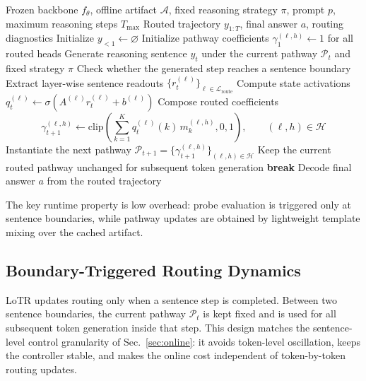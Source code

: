 \begin{algorithm}[t]
\caption{LoTR Online Sentence-Level Routing}
\label{alg:lotr_online}
\begin{algorithmic}[1]
\REQUIRE Frozen backbone \(f_\theta\), offline artifact \(\mathcal{A}\), fixed reasoning strategy \(\pi\), prompt \(p\), maximum reasoning steps \(T_{\max}\)
\ENSURE Routed trajectory \(y_{1:T}\), final answer \(a\), routing diagnostics
\STATE Initialize \(y_{<1}\gets\varnothing\)
\STATE Initialize pathway coefficients \(\gamma_1^{(\ell,h)}\gets 1\) for all routed heads
    \STATE Generate reasoning sentence \(y_t\) under the current pathway \(\mathcal{P}_t\) and fixed strategy \(\pi\)
    \STATE Check whether the generated step reaches a sentence boundary
        \STATE Extract layer-wise sentence readouts \(\{r_t^{(\ell)}\}_{\ell\in\mathcal{L}_{\mathrm{route}}}\)
            \STATE Compute state activations \(q_t^{(\ell)}\gets \sigma(A^{(\ell)}r_t^{(\ell)}+b^{(\ell)})\)
            \STATE Compose routed coefficients
            \[
            \gamma_{t+1}^{(\ell,h)}\gets
            \mathrm{clip}\!\left(\sum_{k=1}^{K} q_t^{(\ell)}(k)\,m_k^{(\ell,h)},0,1\right),
            \qquad (\ell,h)\in\mathcal{H}
            \]
        \ENDFOR
        \STATE Instantiate the next pathway \(\mathcal{P}_{t+1}=\{\gamma_{t+1}^{(\ell,h)}\}_{(\ell,h)\in\mathcal{H}}\)
    \ELSE
        \STATE Keep the current routed pathway unchanged for subsequent token generation
    \ENDIF
        \STATE \textbf{break}
    \ENDIF
\ENDFOR
\STATE Decode final answer \(a\) from the routed trajectory
\end{algorithmic}
\end{algorithm}

The key runtime property is low overhead: probe evaluation is triggered only at sentence boundaries, while pathway updates are obtained by lightweight template mixing over the cached artifact.

\subsection{Boundary-Triggered Routing Dynamics}
\label{app:alg_online_boundary}

LoTR updates routing only when a sentence step is completed. Between two sentence boundaries, the current pathway \(\mathcal{P}_t\) is kept fixed and is used for all subsequent token generation inside that step. This design matches the sentence-level control granularity of Sec.~\ref{sec:online}: it avoids token-level oscillation, keeps the controller stable, and makes the online cost independent of token-by-token routing updates.

